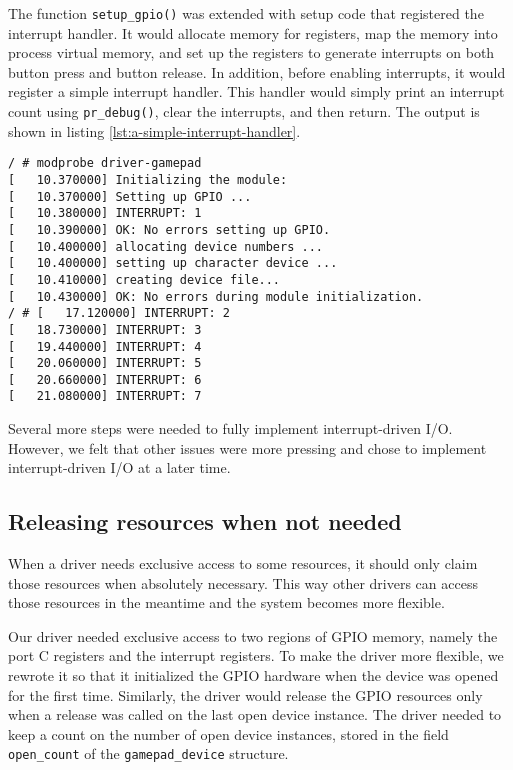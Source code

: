 The function \texttt{setup\_gpio()} was extended with setup code that registered the interrupt handler. It would allocate memory for registers, map the memory into process virtual memory, and set up the registers to generate interrupts on both button press and button release. In addition, before enabling interrupts, it would register a simple interrupt handler. This handler would simply print an interrupt count using \texttt{pr\_debug()}, clear the interrupts, and then return. The output is shown in listing \ref{lst:a-simple-interrupt-handler}.
\begin{lstlisting}[caption=A simple interrupt handler,label=lst:a-simple-interrupt-handler]
/ # modprobe driver-gamepad
[   10.370000] Initializing the module:
[   10.370000] Setting up GPIO ...
[   10.380000] INTERRUPT: 1
[   10.390000] OK: No errors setting up GPIO.
[   10.400000] allocating device numbers ...
[   10.400000] setting up character device ...
[   10.410000] creating device file...
[   10.430000] OK: No errors during module initialization.
/ # [   17.120000] INTERRUPT: 2
[   18.730000] INTERRUPT: 3
[   19.440000] INTERRUPT: 4
[   20.060000] INTERRUPT: 5
[   20.660000] INTERRUPT: 6
[   21.080000] INTERRUPT: 7
\end{lstlisting}

Several more steps were needed to fully implement interrupt-driven I/O. However, we felt that other issues were more pressing and chose to implement interrupt-driven I/O at a later time.

\subsection{Releasing resources when not needed}
When a driver needs exclusive access to some resources, it should only claim those resources when absolutely necessary. This way other drivers can access those resources in the meantime and the system becomes more flexible.

Our driver needed exclusive access to two regions of GPIO memory, namely the port C registers and the interrupt registers. To make the driver more flexible, we rewrote it so that it initialized the GPIO hardware when the device was opened for the first time. Similarly, the driver would release the GPIO resources only when a release was called on the last open device instance. The driver needed to keep a count on the number of open device instances, stored in the field \texttt{open\_count} of the \texttt{gamepad\_device} structure.

